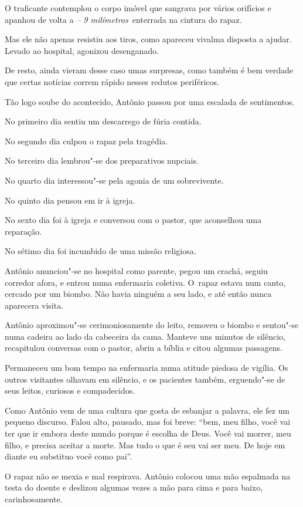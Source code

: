 O traficante contemplou o corpo imóvel que sangrava por vários orifícios
e apanhou de volta a \emph{ -- 9 milímetros}~enterrada na cintura do
rapaz.

Mas ele não apenas resistiu aos tiros, como apareceu vivalma disposta a
ajudar. Levado ao hospital, agonizou desenganado.

De resto, ainda vieram desse caso umas surpresas, como também é bem
verdade que certas notícias correm rápido nesses redutos periféricos.

Tão logo soube do acontecido, Antônio passou por uma escalada de
sentimentos.

No primeiro dia sentiu um descarrego de fúria contida.

No segundo dia culpou o rapaz pela tragédia.

No terceiro dia lembrou"-se dos preparativos nupciais.

No quarto dia interessou"-se pela agonia de um sobrevivente.

No quinto dia pensou em ir à igreja.

No sexto dia foi à igreja e conversou com o pastor, que aconselhou uma
reparação.

No sétimo dia foi incumbido de uma missão religiosa.

\asterisc{}

Antônio anunciou"-se no hospital como parente, pegou um crachá, seguiu
corredor afora, e entrou numa enfermaria coletiva. O~rapaz estava num
canto, cercado por um biombo. Não havia ninguém a seu lado, e até então
nunca aparecera visita.

Antônio aproximou"-se cerimoniosamente do leito, removeu o biombo e
sentou"-se numa cadeira ao lado da cabeceira da cama. Manteve uns minutos
de silêncio, recapitulou conversas com o pastor, abriu a bíblia e citou
algumas passagens.

Permaneceu um bom tempo na enfermaria numa atitude piedosa de vigília.
Os outros visitantes olhavam em silêncio, e os pacientes também,
erguendo"-se de seus leitos, curiosos e compadecidos.

Como Antônio vem de uma cultura que gosta de esbanjar a palavra, ele fez
um pequeno discurso. Falou alto, pausado, mas foi breve: ``bem, meu
filho, você vai ter que ir embora deste mundo porque é escolha de Deus.
Você vai morrer, meu filho, e precisa aceitar a morte. Mas tudo o que é
seu vai ser meu. De hoje em diante eu substituo você como pai''.

O rapaz não se mexia e mal respirava. Antônio colocou uma mão espalmada
na testa do doente e deslizou algumas vezes a mão para cima e para
baixo, carinhosamente.

